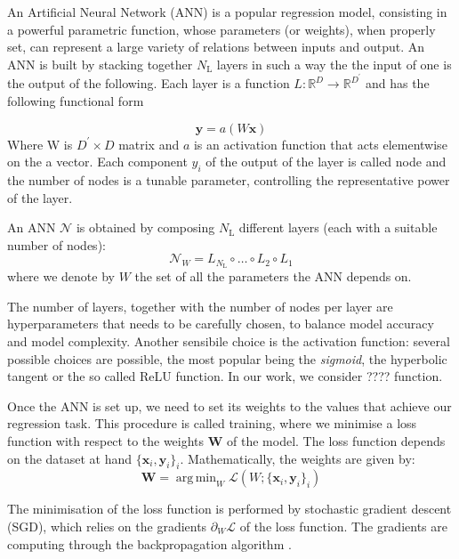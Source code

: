 \documentclass[twocolumn,showpacs,preprintnumbers,nofootinbib,prd,
superscriptaddress,10pt]{revtex4-1}
\newcommand{\R}{\mathbb{R}}
\DeclareMathOperator*{\argmin}{arg\,min}
\begin{document}
An Artificial Neural Network (ANN) is a popular regression model, consisting in a powerful parametric function, whose parameters (or weights), when properly set, can represent a large variety of relations between inputs and output.
An ANN is built by stacking together $N_\text{L}$ layers in such a way the the input of one is the output of the following. Each layer is a function $L: \R^D \rightarrow \R^{D^\prime} $ and has the following functional form

\begin{equation}
	\boldsymbol{y} = a(W\boldsymbol{x})
\end{equation}
%
Where W is $D^\prime \times D$ matrix and $a$ is an activation function that acts elementwise on the a vector.
Each component $y_i$ of the output of the layer is called node and the number of nodes is a tunable parameter, controlling the representative power of the layer.

An ANN $\mathcal{N}$ is obtained by composing $N_\text{L}$ different layers (each with a suitable number of nodes):
%
\begin{equation}
	\mathcal{N}_W = L_{N_\text{L}} \circ \hdots \circ L_2 \circ L_1
\end{equation}
%
where we denote by $W$ the set of all the parameters the ANN depends on.

The number of layers, together with the number of nodes per layer are hyperparameters that needs to be carefully chosen, to balance model accuracy and model complexity.
Another sensibile choice is the activation function: several possible choices are possible, the most popular being the {\it sigmoid}, the hyperbolic tangent or the so called ReLU function. In our work, we consider ???? function.

Once the ANN is set up, we need to set its weights to the values that achieve our regression task.
This procedure is called training, where we minimise a loss function with respect to the weights $\boldsymbol{W}$ of the model.
The loss function depends on the dataset at hand ${\{\boldsymbol{x}_i, \boldsymbol{y}_i\}_i}$.
Mathematically, the weights are given by:
%
\begin{equation}\label{eq:loss_general}
	\boldsymbol{W} = \argmin_W \mathcal{L}(W; \{\boldsymbol{x}_i, \boldsymbol{y}_i\}_i)
\end{equation}

The minimisation of the loss function is performed by stochastic gradient descent (SGD), which relies on the gradients $\partial_W \mathcal{L}$ of the loss function. The gradients are computing through the backpropagation algorithm \cite{}.
\end{document}
